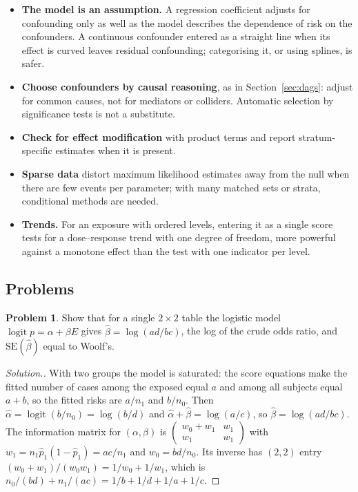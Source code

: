 \documentclass[11pt,a4paper]{article}
\numberwithin{equation}{section}
\theoremstyle{definition}
\newtheorem{problemx}{Problem}[subsection]
\newenvironment{problem}{\begin{problemx}}{\end{problemx}}
\newenvironment{solution}
  {\renewcommand{\qedsymbol}{}\begin{proof}[\textit{Solution}.]}
  {\end{proof}}
\begin{document}
\begin{itemize}
\item \textbf{The model is an assumption.} A regression coefficient adjusts for confounding only as well as the model describes the
dependence of risk on the confounders. A continuous confounder entered as a straight line when its effect is curved leaves residual
confounding; categorising it, or using splines, is safer.
\item \textbf{Choose confounders by causal reasoning}, as in Section~\ref{sec:dags}: adjust for common causes, not for mediators or
colliders. Automatic selection by significance tests is not a substitute.
\item \textbf{Check for effect modification} with product terms and report stratum-specific estimates when it is present.
\item \textbf{Sparse data} distort maximum likelihood estimates away from the null when there are few events per parameter; with many
matched sets or strata, conditional methods are needed.
\item \textbf{Trends.} For an exposure with ordered levels, entering it as a single score tests for a dose--response trend with one degree
of freedom, more powerful against a monotone effect than the test with one indicator per level.
\end{itemize}

\subsection{Problems}

\begin{problem}
Show that for a single $2 \times 2$ table the logistic model $\operatorname{logit} p = \alpha + \beta E$ gives $\hat\beta = \log(ad/bc)$, the log of the crude odds ratio, and $\text{SE}(\hat\beta)$
equal to Woolf's.
\end{problem}

\begin{solution}
With two groups the model is saturated: the score equations make the fitted number of cases among the exposed equal $a$ and among all
subjects equal $a + b$, so the fitted risks are $a/n_1$ and $b/n_0$. Then $\hat\alpha = \operatorname{logit}(b/n_0) = \log(b/d)$ and $\hat\alpha + \hat\beta = \log(a/c)$, so $\hat\beta = \log(ad/bc)$. The
information matrix for $(\alpha, \beta)$ is $\begin{pmatrix} w_0 + w_1 & w_1 \\ w_1 & w_1 \end{pmatrix}$ with $w_1 = n_1\hat p_1(1 - \hat p_1) = ac/n_1$ and $w_0 = bd/n_0$. Its inverse has $(2, 2)$ entry $(w_0 + w_1)/(w_0 w_1) = 1/w_0 + 1/w_1$,
which is $n_0/(bd) + n_1/(ac) = 1/b + 1/d + 1/a + 1/c$.
\end{solution}
\end{document}
